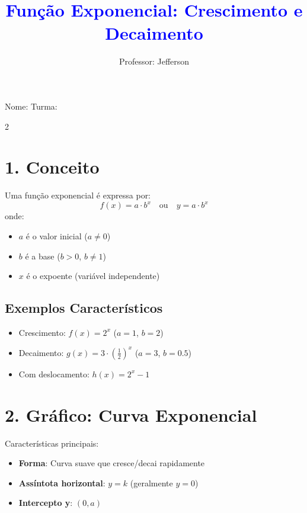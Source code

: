 \documentclass[11pt]{article}
\title{\textcolor{blue}{Função Exponencial: Crescimento e Decaimento}}
\author{Professor: Jefferson}
\date{}
\begin{document}
\maketitle
\vspace{-1cm}

\begin{center}
\large{Nome: \underline{\hspace{8cm}} \quad Turma: \underline{\hspace{3cm}}}
\end{center}

\begin{multicols}{2}

\section*{1. Conceito}
Uma função exponencial é expressa por:
\[
f(x) = a \cdot b^x \quad \text{ou} \quad y = a \cdot b^x
\]
onde:
\begin{itemize}
    \item $a$ é o valor inicial ($a \neq 0$)
    \item $b$ é a base ($b > 0$, $b \neq 1$)
    \item $x$ é o expoente (variável independente)
\end{itemize}

\subsection*{Exemplos Característicos}
\begin{itemize}
    \item Crescimento: $f(x) = 2^x$ \quad ($a=1$, $b=2$)
    \item Decaimento: $g(x) = 3 \cdot \left(\frac{1}{2}\right)^x$ \quad ($a=3$, $b=0.5$)
    \item Com deslocamento: $h(x) = 2^{x} - 1$
\end{itemize}

\section*{2. Gráfico: Curva Exponencial}
Características principais:
\begin{itemize}
    \item \textbf{Forma}: Curva suave que cresce/decai rapidamente
    \item \textbf{Assíntota horizontal}: $y = k$ (geralmente $y=0$)
    \item \textbf{Intercepto y}: $(0, a)$
\end{itemize}


\end{multicols}
\end{document}
